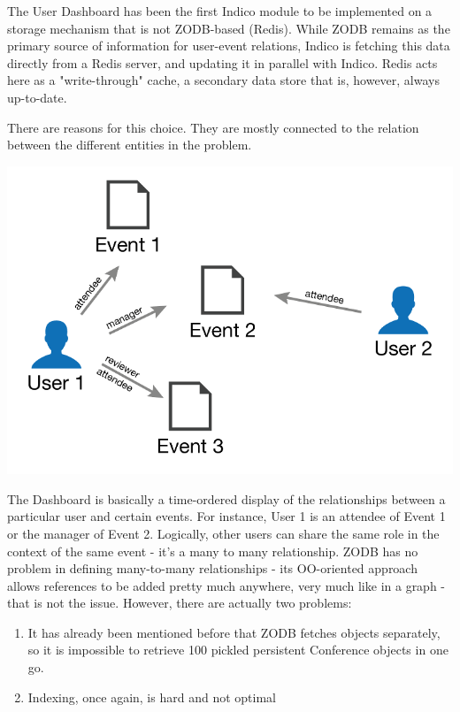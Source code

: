 The User Dashboard has been the first Indico module to be implemented on a storage mechanism that is not ZODB-based (Redis). While ZODB remains as the primary source of information for user-event relations, Indico is fetching this data directly from a Redis server, and updating it in parallel with Indico. Redis acts here as a "write-through" cache, a secondary data store that is, however, always up-to-date.

There are reasons for this choice. They are mostly connected to the relation between the different entities in the problem.

\hfill \includegraphics[scale=1]{2/figures/dashboard.png}

The Dashboard is basically a time-ordered display of the relationships between a particular user and certain events. For instance, User 1 is an attendee of Event 1 or the manager of Event 2. Logically, other users can share the same role in the context of the same event - it's a many to many relationship. ZODB has no problem in defining many-to-many relationships - its OO-oriented approach allows references to be added pretty much anywhere, very much like in a graph - that is not the issue. However, there are actually two problems:

\begin{enumerate}
  \item It has already been mentioned before that ZODB fetches objects separately, so it is impossible to retrieve 100 pickled persistent Conference objects in one go.
  \item Indexing, once again, is hard and not optimal
\end{enumerate}

